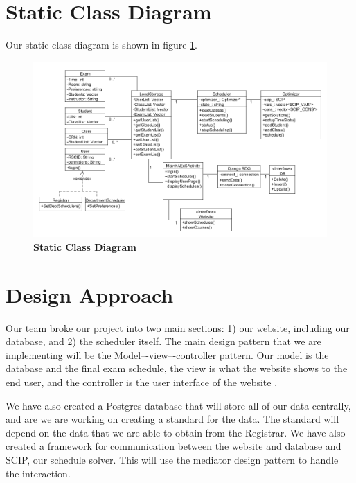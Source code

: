 \documentclass[11pt]{article}
\begin{document}
\section{Static Class Diagram}  %
Our static class diagram is shown in figure \ref{fig:staticDiagram}.

\begin{figure}
	\centering
		\includegraphics[width = \textwidth]{staticClassDiagram.png}
	\caption{\bf Static Class Diagram}
	\label{fig:staticDiagram}
\end{figure}


\section{ Design Approach}  %

Our team broke our project into two main sections: 1) our website, including our database, and 2) the scheduler itself. The main design pattern that we are implementing will be the 
Model–-view–-controller  %
pattern. Our model is the database and the final exam schedule, the view is what the website shows to the end user, and the controller is the user interface of the website . 

 We have also created a Postgres database that will store all of our data centrally, and are we are working on creating a standard for the data.  The standard will depend on the data that we are able to obtain from the Registrar.  We have also created a framework for communication between the website and database and SCIP, our schedule solver. This will use the mediator design pattern to handle the interaction. 
\end{document}
